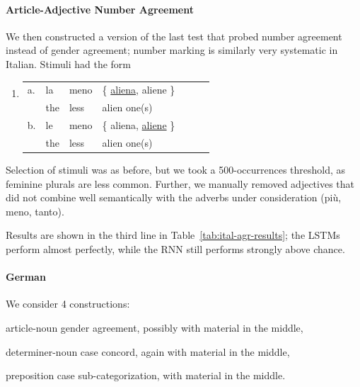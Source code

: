 \paragraph{Article-Adjective Number Agreement}
We then constructed a version of the last test that probed number agreement instead of gender agreement; number marking is similarly very systematic in Italian.
Stimuli had the form
\begin{enumerate}[label={(\arabic*)}]
	\item 
\begin{tabular}[t]{lllllll}
	a. & la & meno & \{ \underline{aliena}, aliene \} \\
   &  the & less & alien one(s)  \\
	b. & le & meno & \{ aliena, \underline{aliene} \} \\
    &the & less & alien one(s) \\
\end{tabular}
\end{enumerate}
Selection of stimuli was  as before, but  we took a 500-occurrences threshold, as feminine plurals are less common.
Further, we manually removed adjectives that did not combine well semantically with the adverbs under consideration (pi{\`u}, meno, tanto).

Results are shown in the third line in Table~\ref{tab:ital-agr-results}; the LSTMs perform almost perfectly, while the RNN still performs strongly above chance.





\paragraph{German} We consider 4 constructions:
\begin{inparaenum}[i)]
\item article-noun gender agreement, possibly with material in the middle,
\item determiner-noun case concord, again with material in the middle,
\item preposition case sub-categorization, with material in the middle.
\end{inparaenum}


